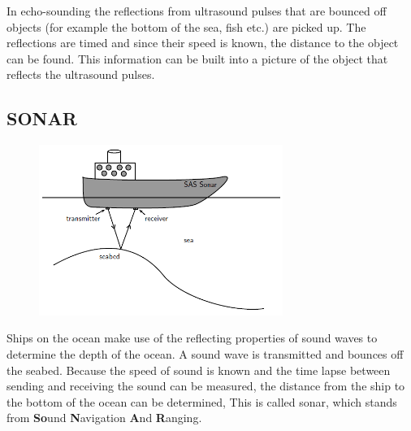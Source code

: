 	\par
      \label{m38800*id185186}In echo-sounding the reflections from ultrasound pulses that are bounced off objects (for example the bottom of the sea, fish etc.) are picked up. The reflections are timed and since their speed is known, the distance to the object can be found. This information can be built into a picture of the object that reflects the ultrasound pulses.\par 
    \label{m38800*cid7}
            \subsection{ SONAR}
            \nopagebreak
      \label{m38800*id185202}
    \setcounter{subfigure}{0}
	\begin{figure}[H] %
    \begin{center}
    \label{m38800*id185205!!!underscore!!!media}\label{m38800*id185205!!!underscore!!!printimage}\includegraphics[width=300px]{col11305.imgs/m38800_PG11C5_005.png} %
      \vspace{2pt}
    \vspace{.1in}
    \end{center}
 \end{figure}       
      \par 
      \label{m38800*id185212}Ships on the ocean make use of the reflecting properties of sound waves to determine the depth of the ocean. A sound wave is transmitted and bounces off the seabed. Because the speed of sound is known and the time lapse between sending and receiving the sound can be measured, the distance from the ship to the bottom of the ocean can be determined, This is called sonar, which stands from \textbf{So}und \textbf{N}avigation \textbf{A}nd \textbf{R}anging.\par 
      \label{m38800*uid13}
